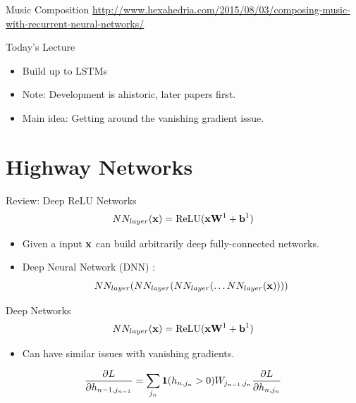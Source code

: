 \documentclass{beamer}
\begin{document}
\begin{frame}{Music Composition}
  \url{http://www.hexahedria.com/2015/08/03/composing-music-with-recurrent-neural-networks/}
\end{frame}

\begin{frame}{Today's Lecture}
  \begin{itemize}
  \item Build up to LSTMs 
    \air 

  \item Note: Development is ahistoric, later papers first.
    \air

  \item Main idea: Getting around the vanishing gradient issue.   
  \end{itemize}
\end{frame}

\section{Highway Networks}

\begin{frame}{Review: Deep ReLU Networks}
  \[NN_{layer}(\boldx) = \relu(\boldx \boldW^1 + \boldb^1)  \]

  \begin{itemize}
  \item Given a input $\mathbf{x}$ can build arbitrarily deep fully-connected networks.
    \air 

  \item Deep Neural Network (DNN) : 
    \[NN_{layer}(NN_{layer}(NN_{layer}(\ldots NN_{layer}(\mathbf{x}))))\]
    \air 

  \end{itemize}
\end{frame}

\begin{frame}{Deep Networks}
  \[NN_{layer}(\boldx) = \relu(\boldx \boldW^1 + \boldb^1)  \]

      \begin{center}
    \end{center}
    \pause
    
  \begin{itemize}
  \item  Can have similar issues with vanishing gradients.
  \end{itemize}
  \[ \frac{\partial L}{\partial h_{n-1,j_{n-1}} }   =  \sum_{j_n}  \mathbf{1}(h_{n, j_n} > 0) W_{j_{n-1},j_n}  \frac{\partial L}{\partial h_{n, j_n}}     \]

\end{frame}
\end{document}
